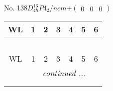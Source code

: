 \documentclass[fleqn,9pt,landscape]{jsarticle}
\begin{document}
\newpage
No. 138\quad$D_{4h}^{16}$\quad$P4_2/ncm$\quad[ tetragonal ]\quad$+\begin{pmatrix} 0 & 0 & 0 \end{pmatrix}$
\begin{center}
\renewcommand{\arraystretch}{1.2}
\begin{longtable}{ccccccc}
 \hline \hline
WL & 1 & 2 & 3 & 4 & 5 & 6 \\ \hline \endfirsthead

\multicolumn{6}{l}{\tablename\ \thetable{}} \\
 \hline \hline
WL & 1 & 2 & 3 & 4 & 5 & 6 \\ \hline \endhead

 \hline \hline
\multicolumn{6}{r}{\footnotesize\it continued ...} \\ \endfoot

 \hline \hline
\multicolumn{6}{r}{} \\ \endlastfoot


\end{longtable}
\end{center}
\end{document}
